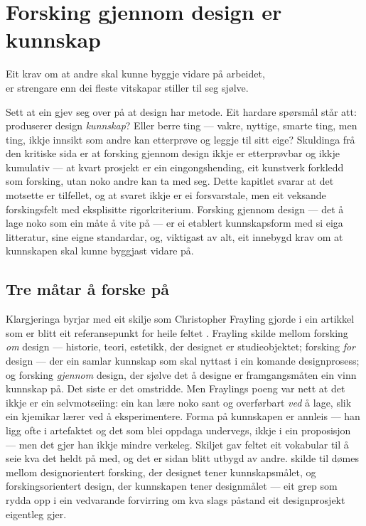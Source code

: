 \chapter{Forsking gjennom design er kunnskap}

\begin{motto}
Eit krav om at andre skal kunne byggje vidare på arbeidet,\\ er strengare enn dei fleste vitskapar stiller til seg sjølve.
\end{motto}

Sett at ein gjev seg over på at design har metode. Eit hardare spørsmål står att: produserer design \emph{kunnskap}? Eller berre ting — vakre, nyttige, smarte ting, men ting, ikkje innsikt som andre kan etterprøve og leggje til sitt eige? Skuldinga frå den kritiske sida er at forsking gjennom design ikkje er etterprøvbar og ikkje kumulativ — at kvart prosjekt er ein eingongshending, eit kunstverk forkledd som forsking, utan noko andre kan ta med seg. Dette kapitlet svarar at det motsette er tilfellet, og at svaret ikkje er ei forsvarstale, men eit veksande forskingsfelt med eksplisitte rigorkriterium. Forsking gjennom design — det å lage noko som ein måte å vite på — er ei etablert kunnskapsform med si eiga litteratur, sine eigne standardar, og, viktigast av alt, eit innebygd krav om at kunnskapen skal kunne byggjast vidare på.

\section{Tre måtar å forske på}

Klargjeringa byrjar med eit skilje som Christopher Frayling gjorde i ein artikkel som er blitt eit referansepunkt for heile feltet \autocite{frayling1993}. Frayling skilde mellom forsking \emph{om} design — historie, teori, estetikk, der designet er studieobjektet; forsking \emph{for} design — der ein samlar kunnskap som skal nyttast i ein komande designprosess; og forsking \emph{gjennom} design, der sjølve det å designe er framgangsmåten ein vinn kunnskap på. Det siste er det omstridde. Men Fraylings poeng var nett at det ikkje er ein selvmotseiing: ein kan lære noko sant og overførbart \emph{ved} å lage, slik ein kjemikar lærer ved å eksperimentere. Forma på kunnskapen er annleis — han ligg ofte i artefaktet og det som blei oppdaga undervegs, ikkje i ein proposisjon — men det gjer han ikkje mindre verkeleg. Skiljet gav feltet eit vokabular til å seie kva det heldt på med, og det er sidan blitt utbygd av andre. \textcite{fallman2003design} skilde til dømes mellom designorientert forsking, der designet tener kunnskapsmålet, og forskingsorientert design, der kunnskapen tener designmålet — eit grep som rydda opp i ein vedvarande forvirring om kva slags påstand eit designprosjekt eigentleg gjer.

